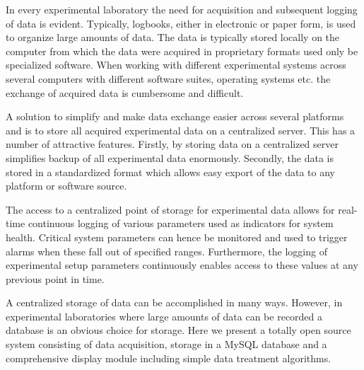 In every experimental laboratory the need for acquisition and subsequent
logging of data is evident. Typically, logbooks, either in electronic or paper
form, is used to organize large amounts of data. The data is typically stored
locally on the computer from which the data were acquired in proprietary
formats used only be specialized software. When working with different
experimental systems across several computers with different software suites,
operating systems etc. the exchange of acquired data is cumbersome and
difficult.

A solution to simplify and make data exchange easier across several platforms
and is to store all acquired experimental data on a centralized server. This
has a number of attractive features. Firstly, by storing data on a centralized
server simplifies backup of all experimental data enormously. Secondly, the
data is stored in a standardized format which allows easy export of the data to
any platform or software source.

The access to a centralized point of storage for experimental data allows for
real-time continuous logging of various parameters used as indicators for
system health. Critical system parameters can hence be monitored and used to
trigger alarms when these fall out of specified ranges. Furthermore, the
logging of experimental setup parameters continuously enables access to these
values at any previous point in time.

A centralized storage of data can be accomplished in many ways. However, in
experimental laboratories where large amounts of data can be recorded a
database is an obvious choice for storage. Here we present a totally open
source system consisting of data acquisition, storage in a MySQL database and a
comprehensive display module including simple data treatment algorithms.

